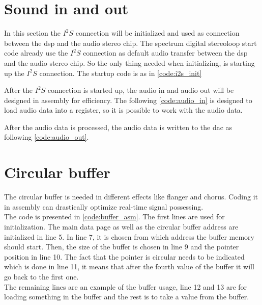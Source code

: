 \section{Sound in and out}
In this section the $I^2S$ connection will be initialized and used as connection between the \gls{dsp} and the audio stereo chip. The spectrum digital stereoloop start code \citep{stereoloop} already use the $I^2S$ connection as default audio transfer between the \gls{dsp} and the audio stereo chip. So the only thing needed when initializing, is starting up the $I^2S$ connection. The startup code is as in \autoref{code:i2s_init}

After the $I^2S$ connection is started up, the audio in and audio out will be designed in assembly for efficiency. The following \autoref{code:audio_in} is designed to load audio data into a register, so it is possible to work with the audio data. 

After the audio data is processed, the audio data is written to the \gls{dac} as following \autoref{code:audio_out}.

\section{Circular buffer}

The circular buffer is needed in different effects like flanger and chorus. Coding it in assembly can drastically optimize real-time signal possessing. \\

The code is presented in \autoref{code:buffer_asm}. The first lines are used for initialization. The main data page as well as the circular buffer address are initialized in line 5. In line 7, it is chosen from which address the buffer memory should start. Then, the size of the buffer is chosen in line 9 and the pointer position in line 10. The fact that the pointer is circular needs to be indicated which is done in line 11, it means that after the fourth value of the buffer it will go back to the first one.\\

The remaining lines are an example of the buffer usage, line 12 and 13 are for loading something in the buffer and the rest is to take a value from the buffer. 







